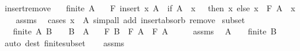 \begin{isabellebody}
\ insert{\isacharunderscore}{\kern0pt}remove{\isacharcolon}{\kern0pt}\isanewline
\ \ \ {\isachardoublequoteopen}finite\ A{\isachardoublequoteclose}\isanewline
\ \ \ {\isachardoublequoteopen}F\ {\isacharparenleft}{\kern0pt}insert\ x\ A{\isacharparenright}{\kern0pt}\ {\isacharequal}{\kern0pt}\ {\isacharparenleft}{\kern0pt}if\ A\ {\isacharminus}{\kern0pt}\ {\isacharbraceleft}{\kern0pt}x{\isacharbraceright}{\kern0pt}\ {\isacharequal}{\kern0pt}\ {\isacharbraceleft}{\kern0pt}{\isacharbraceright}{\kern0pt}\ then\ x\ else\ x\ \isactrlbold {\isacharasterisk}{\kern0pt}\ F\ {\isacharparenleft}{\kern0pt}A\ {\isacharminus}{\kern0pt}\ {\isacharbraceleft}{\kern0pt}x{\isacharbraceright}{\kern0pt}{\isacharparenright}{\kern0pt}{\isacharparenright}{\kern0pt}{\isachardoublequoteclose}\isanewline
%
\isadelimproof
\ \ %
\endisadelimproof
%
\isatagproof
{}\isamarkupfalse%
\ assms\ \isamarkupfalse%
\ {\isacharparenleft}{\kern0pt}cases\ {\isachardoublequoteopen}x\ {\isasymin}\ A{\isachardoublequoteclose}{\isacharparenright}{\kern0pt}\ {\isacharparenleft}{\kern0pt}simp{\isacharunderscore}{\kern0pt}all\ add{\isacharcolon}{\kern0pt}\ insert{\isacharunderscore}{\kern0pt}absorb\ remove{\isacharparenright}{\kern0pt}%
\endisatagproof
{\isafoldproof}%
%
\isadelimproof
\isanewline
%
\endisadelimproof
\isanewline
{}\isamarkupfalse%
\ subset{\isacharcolon}{\kern0pt}\isanewline
\ \ \ {\isachardoublequoteopen}finite\ A{\isachardoublequoteclose}\ {\isachardoublequoteopen}B\ {\isasymnoteq}\ {\isacharbraceleft}{\kern0pt}{\isacharbraceright}{\kern0pt}{\isachardoublequoteclose}\ \ {\isachardoublequoteopen}B\ {\isasymsubseteq}\ A{\isachardoublequoteclose}\isanewline
\ \ \ {\isachardoublequoteopen}F\ B\ \isactrlbold {\isacharasterisk}{\kern0pt}\ F\ A\ {\isacharequal}{\kern0pt}\ F\ A{\isachardoublequoteclose}\isanewline
%
\isadelimproof
%
\endisadelimproof
%
\isatagproof
{}\isamarkupfalse%
\ {\isacharminus}{\kern0pt}\isanewline
\ \ \isamarkupfalse%
\ assms\ \isamarkupfalse%
\ {\isachardoublequoteopen}A\ {\isasymnoteq}\ {\isacharbraceleft}{\kern0pt}{\isacharbraceright}{\kern0pt}{\isachardoublequoteclose}\ \ {\isachardoublequoteopen}finite\ B{\isachardoublequoteclose}\ \isamarkupfalse%
\ {\isacharparenleft}{\kern0pt}auto\ dest{\isacharcolon}{\kern0pt}\ finite{\isacharunderscore}{\kern0pt}subset{\isacharparenright}{\kern0pt}\isanewline
\ \ \isamarkupfalse%
\ assms\ \isamarkupfalse%

\end{isabellebody}
